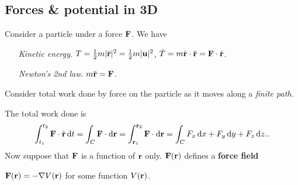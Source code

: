 \subsection{Forces \& potential in 3D}
Consider a particle under a force $ {\bf F} $. We have
\begin{enumerate}[align=left]
    \item[\textit{Kinetic energy}.] $ T = \frac{1}{2}m|\dot{{\bf r}}|^2 = \frac{1}{2}m |{\bf u}|^2 $, $ \dot{T}= m \dot{{\bf r}}\cdot \ddot{{\bf r}}={\bf F} \cdot \dot{{\bf r}} $.
    \item[\textit{Newton's 2nd law}.] $ m \ddot{{\bf r}}={\bf F} $.   
\end{enumerate}
Consider total work done by force on the particle as it moves along a \textit{finite path}.
\begin{center}
\end{center}
The total work done is
\[
    \int_{t_1}^{t_2} {\bf F} \cdot \dot{{\bf r}} \,\mathrm{d}t = \int_C {\bf F} \cdot \mathrm{d}{\bf r}=\int_{{\bf r}_1}^{{\bf r}_2} {\bf F} \cdot \mathrm{d}{\bf r}=\int_C F_x\,\mathrm{d} x+F_y\,\mathrm{d} y+F_z\,\mathrm{d} z..
\]
Now suppose that ${\bf F}$ is a function of ${\bf r}$ only. $ {\bf F}({\bf r}) $ defines a \textbf{force field}

\begin{definition}
    $ {\bf F}({\bf r}) = - \nabla V({\bf r}) $ for some function $ V({\bf r}) $.
\end{definition}

